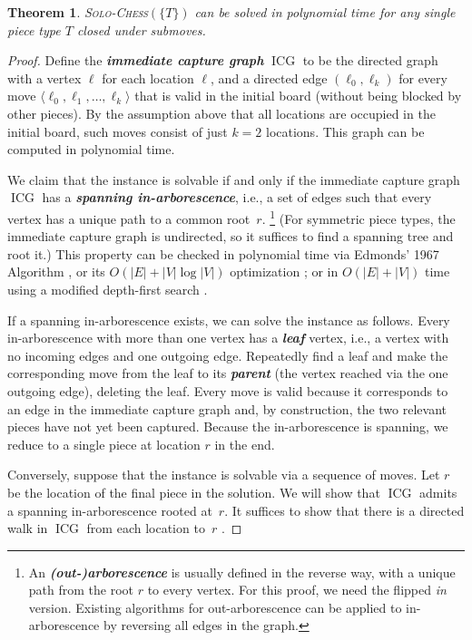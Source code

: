 \documentclass[11pt,letterpaper]{article}
\def\defn#1{\textbf{\textit{\boldmath #1}}}
\newcommand{\solochessn}[1]{\textsc{Solo-Chess}$(#1)$}
\newcommand{\ICG}{\operatorname{ICG}}
\theoremstyle{plain}
\newtheorem{theorem}{Theorem}[section]
\theoremstyle{definition}
\theoremstyle{remark}
\numberwithin{equation}{section}
\begin{document}
\begin{theorem} \label{thm:one}
  \solochessn{\{T\}} can be solved in polynomial time
  for any single piece type $T$ closed under submoves.
\end{theorem}
\begin{proof}
  Define the \defn{immediate capture graph} $\ICG$
  to be the directed graph with a vertex $\ell$ for each location $\ell$,
  and a directed edge $(\ell_0, \ell_k)$
  for every move $\langle \ell_0, \ell_1, \dots, \ell_k \rangle$
  that is valid in the initial board (without being blocked by other pieces).
  By the assumption above that all locations are occupied in the initial board,
  such moves consist of just $k=2$ locations.
  This graph can be computed in polynomial time.

  We claim that the instance is solvable if and only if
  the immediate capture graph $\ICG$
  has a \defn{spanning in-arborescence},
  i.e., a set of edges such that every vertex
  has a unique path to a common root~$r$.%
  \footnote{An \defn{(out-)arborescence} is usually defined in the
    reverse way, with a unique path from the root $r$ to every vertex.
    For this proof, we need the flipped \emph{in} version.
    Existing algorithms for out-arborescence can be applied to in-arborescence
    by reversing all edges in the graph.}
  (For symmetric piece types, the immediate capture graph is undirected,
  so it suffices to find a spanning tree and root it.)
  This property can be checked in polynomial time via Edmonds' 1967 Algorithm
  \cite{edmonds-arborescence},
  or its $O(|E| + |V| \log |V|)$ optimization \cite{fast-arborescence};
  or in $O(|E| + |V|)$ time using a modified depth-first search
  \cite[Exercise 6.10]{arborescences}.

  If a spanning in-arborescence exists, we can solve the instance as follows.
  Every in-arborescence with more than one vertex has a \defn{leaf} vertex,
  i.e., a vertex with no incoming edges and one outgoing edge.
  Repeatedly find a leaf and make the corresponding move from the
  leaf to its \defn{parent} (the vertex reached via the one outgoing edge),
  deleting the leaf.
  Every move is valid because it corresponds to an edge in the
  immediate capture graph and, by construction,
  the two relevant pieces have not yet been captured.
  Because the in-arborescence is spanning, we reduce to a single piece
  at location $r$ in the end.

  Conversely, suppose that the instance is solvable via a sequence of moves.
  Let $r$ be the location of the final piece in the solution.
  We will show that $\ICG$ admits a spanning in-arborescence rooted at~$r$.
  It suffices to show that there is a directed walk in $\ICG$
  from each location to~$r$ \cite[Theorem 2.5(d)]{arborescences}.


\end{proof}
\end{document}
